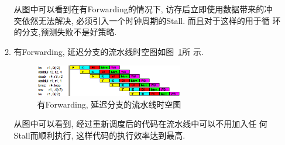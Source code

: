 \begin{solve}
\begin{enumerate}
\begin{enumerate}
      从图中可以看到在有Forwarding的情况下, 访存后立即使用数据带来的冲
      突依然无法解决, 必须引入一个时钟周期的Stall. 而且对于这样的用于循
      环的分支,预测失败不是好策略.
      
    \item 有Forwarding, 延迟分支的流水线时空图如图~\ref{fig:3-11-3}所
     示. 
     
      \begin{figure}[!h]
        \centering
        \includegraphics[width=0.65\textwidth]{img/3.png}
        \caption{有Forwarding, 延迟分支的流水线时空图}
        \label{fig:3-11-3}
      \end{figure}

      从图中可以看到, 经过重新调度后的代码在流水线中可以不用加入任
      何Stall而顺利执行, 这样代码的执行效率达到最高.
    \end{enumerate}
  
  \end{enumerate}
\end{solve}

